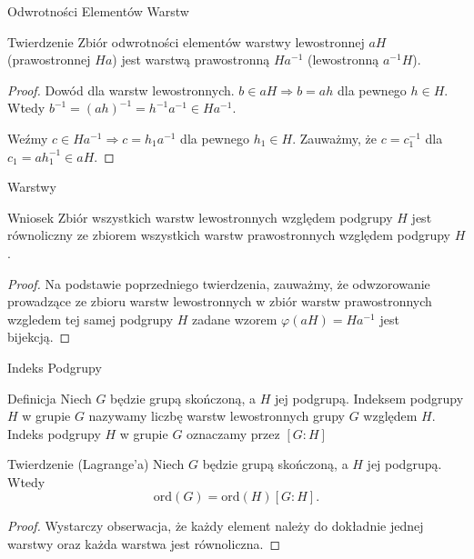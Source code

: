 \documentclass{beamer}
\newcommand{\ord}{\textrm{ord}}
\let\phi\varphi
\begin{document}
\begin{frame}{Odwrotności Elementów Warstw}
    \begin{block}{Twierdzenie}
        Zbiór odwrotności elementów warstwy lewostronnej $aH$ (prawostronnej $Ha$)
        jest warstwą prawostronną $Ha^{-1}$ (lewostronną $a^{-1}H$).
    \end{block}
    \pause
    \begin{proof}
        Dowód dla warstw lewostronnych. $b \in aH \Rightarrow b = ah$ dla pewnego $h \in H$.
        Wtedy $b^{-1} = (ah)^{-1} = h^{-1}a^{-1} \in Ha^{-1}$.

        Weźmy $c \in  Ha^{-1} \Rightarrow c = h_1a^{-1}$ dla pewnego $h_1 \in H$. Zauważmy, że $c = c_1^{-1}$ dla $c_1 = ah_1^{-1} \in aH$.
    \end{proof}
\end{frame}

\begin{frame}{Warstwy}
    \begin{block}{Wniosek}
        Zbiór wszystkich warstw lewostronnych względem podgrupy $H$ jest równoliczny
        ze zbiorem wszystkich warstw prawostronnych względem podgrupy $H$.
    \end{block}
    \begin{proof}
        Na podstawie poprzedniego twierdzenia, zauważmy, że odwzorowanie prowadzące ze zbioru warstw
        lewostronnych w zbiór warstw prawostronnych wzgledem tej samej podgrupy $H$ zadane wzorem
        $\phi(aH) = Ha^{-1}$ jest bijekcją.
    \end{proof}
\end{frame}

\begin{frame}{Indeks Podgrupy}
    \begin{block}{Definicja}
        Niech $G$ będzie grupą skończoną, a $H$ jej podgrupą. \alert{Indeksem podgrupy $H$} w grupie $G$
        nazywamy liczbę warstw lewostronnych grupy $G$ względem $H$. Indeks podgrupy $H$ w grupie $G$ oznaczamy przez $[G:H]$
    \end{block}
    \begin{block}{Twierdzenie (Lagrange'a)}
        Niech $G$ będzie grupą skończoną, a $H$ jej podgrupą. Wtedy 
        $$\ord(G) = \ord(H) [G:H].$$
    \end{block}
    \pause
    \begin{proof}
        Wystarczy obserwacja, że każdy element należy do dokładnie jednej warstwy oraz każda warstwa jest równoliczna.
    \end{proof}
\end{frame}
\end{document}
